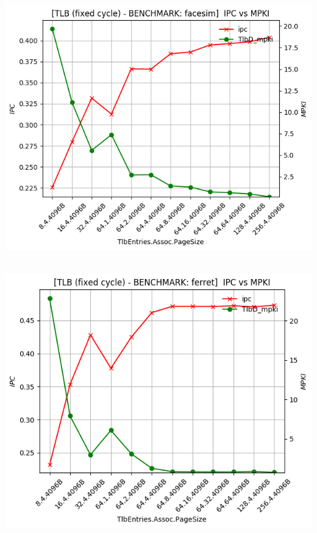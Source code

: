 \begin{minipage}{\textwidth}
    \begin{center}
        \\
        \vspace{3mm}
        \includegraphics[scale=0.70]{graphs/TLB/fixed/facesim.png}
        \vspace{6mm}
    \end{center}
\end{minipage}

\begin{minipage}{\textwidth}
    \begin{center}
        \\
        \vspace{3mm}
        \includegraphics[scale=0.70]{graphs/TLB/fixed/ferret.png}
        \vspace{6mm}
    \end{center}
\end{minipage}


